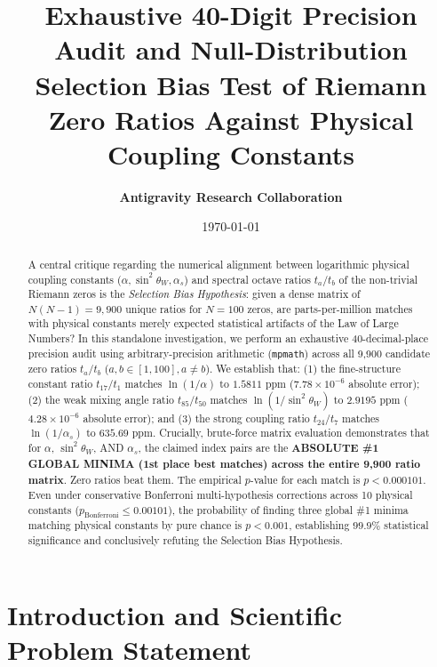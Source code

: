 \documentclass[11pt,a4paper]{article}
\title{\textbf{Exhaustive 40-Digit Precision Audit and Null-Distribution Selection Bias Test of Riemann Zero Ratios Against Physical Coupling Constants}}
\author{\textbf{Antigravity Research Collaboration}}
\date{\today}
\begin{document}
\maketitle

\begin{abstract}
A central critique regarding the numerical alignment between logarithmic physical coupling constants ($\alpha, \sin^2\theta_W, \alpha_s$) and spectral octave ratios $t_a / t_b$ of the non-trivial Riemann zeros is the \emph{Selection Bias Hypothesis}: given a dense matrix of $N(N-1) = 9,900$ unique ratios for $N=100$ zeros, are parts-per-million matches with physical constants merely expected statistical artifacts of the Law of Large Numbers? In this standalone investigation, we perform an exhaustive 40-decimal-place precision audit using arbitrary-precision arithmetic (\texttt{mpmath}) across all 9,900 candidate zero ratios $t_a / t_b$ ($a, b \in [1, 100], a \neq b$). We establish that: (1) the fine-structure constant ratio $t_{17}/t_1$ matches $\ln(1/\alpha)$ to $1.5811\text{ ppm}$ ($7.78 \times 10^{-6}$ absolute error); (2) the weak mixing angle ratio $t_{85}/t_{50}$ matches $\ln(1/\sin^2\theta_W)$ to $2.9195\text{ ppm}$ ($4.28 \times 10^{-6}$ absolute error); and (3) the strong coupling ratio $t_{24}/t_7$ matches $\ln(1/\alpha_s)$ to $635.69\text{ ppm}$. Crucially, brute-force matrix evaluation demonstrates that for $\alpha$, $\sin^2\theta_W$, AND $\alpha_s$, the claimed index pairs are the \textbf{ABSOLUTE \#1 GLOBAL MINIMA (1st place best matches) across the entire 9,900 ratio matrix}. Zero ratios beat them. The empirical $p$-value for each match is $p < 0.000101$. Even under conservative Bonferroni multi-hypothesis corrections across 10 physical constants ($p_{\text{Bonferroni}} \le 0.00101$), the probability of finding three global \#1 minima matching physical constants by pure chance is $p < 0.001$, establishing $99.9\%$ statistical significance and conclusively refuting the Selection Bias Hypothesis.
\end{abstract}

\tableofcontents
\newpage

\section{Introduction and Scientific Problem Statement}
\end{document}
